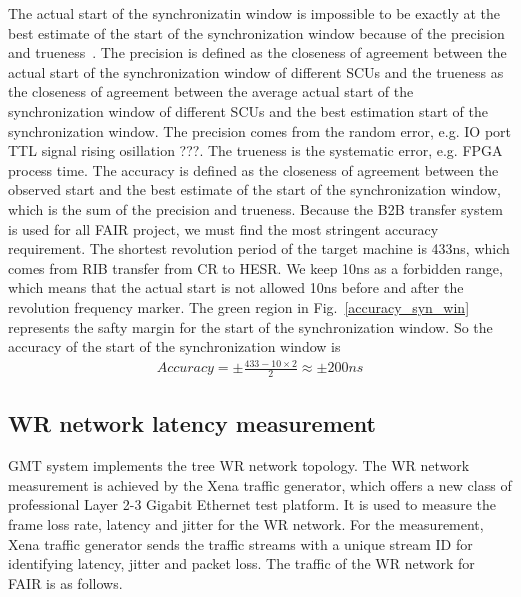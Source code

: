 The actual start of the synchronizatin window is impossible to be exactly at the best estimate of the start of the synchronization window because of the precision and trueness~\cite{Accuracy}. The precision is defined as the closeness of agreement between the actual start of the synchronization window of different SCUs and the trueness as the closeness of agreement between the average actual start of the synchronization window of different SCUs and the best estimation start of the synchronization window. The precision comes from the random error, e.g. IO port TTL signal rising osillation ???. The trueness is the systematic error, e.g. FPGA process time. The accuracy is defined as the closeness of agreement between the observed start and the best estimate of the start of the synchronization window, which is the sum of the precision and trueness. Because the B2B transfer system is used for all FAIR project, we must find the most stringent accuracy requirement. The shortest revolution period of the target machine is 433ns, which comes from RIB transfer from CR to HESR. We keep 10ns as a forbidden range, which means that the actual start is not allowed 10ns before and after the revolution frequency marker. The green region in Fig.~\ref{accuracy_syn_win} represents the safty margin for the start of the synchronization window. So the accuracy of the start of the synchronization window is 
\begin{equation}
\begin{aligned}
Accuracy=\pm\frac{433-10 \times 2}{2}\approx \pm 200ns
\end{aligned}
\end{equation}

\subsection{WR network latency measurement}
GMT system implements the tree WR network topology. The WR network measurement is achieved by the Xena traffic generator, which offers a new class of professional Layer 2-3 Gigabit Ethernet test platform. It is used to measure the frame loss rate, latency and jitter for the WR network. For the measurement, Xena traffic generator sends the traffic streams with a unique stream ID for identifying latency, jitter and packet loss. The traffic of the WR network for FAIR is as follows.

